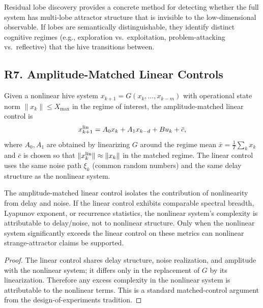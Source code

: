 \begin{designprinciple}
Residual lobe discovery provides a concrete method for detecting whether the
full system has multi-lobe attractor structure that is invisible to the
low-dimensional observable.  If lobes are semantically distinguishable, they
identify distinct cognitive regimes (e.g., exploration vs.\ exploitation,
problem-attacking vs.\ reflective) that the hive transitions between.
\end{designprinciple}

\subsection*{R7. Amplitude-Matched Linear Controls}

\begin{definition}
Given a nonlinear hive system $x_{k+1}=G(x_k,\ldots,x_{k-m})$ with operational
state norm $\|x_k\|\le X_{\max}$ in the regime of interest, the
amplitude-matched linear control is
\[
  x_{k+1}^{\rm lin}=A_0 x_k + A_1 x_{k-d} + B u_k + \bar c,
\]
where $A_0,A_1$ are obtained by linearizing $G$ around the regime mean
$\bar x = \frac{1}{T}\sum_{k} x_k$ and $\bar c$ is chosen so that
$\|x_k^{\rm lin}\|\approx\|x_k\|$ in the matched regime.  The linear control
uses the same noise path $\xi_k$ (common random numbers) and the same delay
structure as the nonlinear system.
\end{definition}

\begin{proposition}
The amplitude-matched linear control isolates the contribution of nonlinearity
from delay and noise.  If the linear control exhibits comparable spectral
breadth, Lyapunov exponent, or recurrence statistics, the nonlinear system's
complexity is attributable to delay/noise, not to nonlinear structure.  Only
when the nonlinear system significantly exceeds the linear control on these
metrics can nonlinear strange-attractor claims be supported.
\end{proposition}

\begin{proof}
The linear control shares delay structure, noise realization, and amplitude
with the nonlinear system; it differs only in the replacement of $G$ by its
linearization.  Therefore any excess complexity in the nonlinear system is
attributable to the nonlinear terms.  This is a standard matched-control
argument from the design-of-experiments tradition.
\end{proof}

